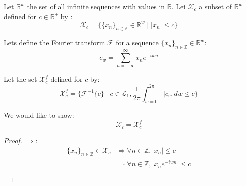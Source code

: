 \documentclass{article}
\begin{document}
\newcommand{\R}{\mathbb{R}}			%
\newcommand{\N}{\mathbb{N}}			%
\newcommand{\Z}{\mathbb{Z}}			%

\newcommand{\Rw}{\mathbb{R}^w}

\newcommand{\seq}[1]{\{#1_n\}_{n\in \Z}}					%

\renewcommand{\exp}[1]{e^{#1}}							%
\newcommand{\abs}[1]{\left| #1 \right|}
\newcommand{\fourier}{\mathcal{F}}	%
\newcommand{\ifourier}{\mathcal{F}^{-1}}	%

\newcommand{\Xc}{\mathcal{X}_c}
\newcommand{\Xf}{\mathcal{X}_c^f}


\newcommand{\Lo}{\mathcal{L}_1}


Let $\Rw$ the set of all infinite sequences with values in $\R$.
Let $\Xc$ a subset of $\Rw$ defined for $c \in \R^+$ by :
$$\Xc = \{ \seq{x} \in \Rw \mid \abs{x_n} \leq c \}$$

Lets define the Fourier transform $\fourier$ for a sequence $\seq{x} \in \Rw$:
$$
c_w = \sum_{n=-\infty}^{\infty} x_n  \exp{-i w n}
$$

Let the set $\Xf$ defined for $c$ by:
$$\Xf = \{ \ifourier\{c\} \mid c \in \Lo, \frac{1}{2\pi} \int_{w=0}^{2\pi} \abs{c_w} dw \leq c \}$$

We would like to show:
$$
\Xc = \Xf
$$

\newcommand{\ewn}{\exp{-i w n}}

\begin{proof}
$\Rightarrow$:
\begin{align*}
\seq{x} \in \Xc &\Rightarrow \forall n\in \Z, \abs{x_n} \leq c\\
& \Rightarrow \forall n\in \Z, \abs{ x_n \ewn } \leq c\\
\end{align*}
\end{proof}
\end{document}
